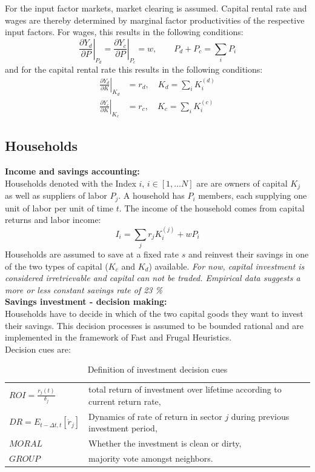 For the input factor markets, market clearing is assumed. Capital rental rate and wages are thereby determined by marginal factor productivities of the respective input factors.
For wages, this results in the following conditions:
\begin{equation}
	\left. \frac{\partial Y_d}{ \partial P} \right|_{P_d} = \left. \frac{\partial Y_c}{\partial P}\right|_{P_c} = w, \qquad P_d + P_c = \sum_i P_i
	\label{eq:wage_rage}
\end{equation}
and for the capital rental rate this results in the following conditions:
\begin{align}
	\left. \frac{\partial Y_d}{\partial K}\right|_{K_d} &= r_d,\quad K_d = \sum_i K^{(d)}_i \nonumber \\
	\left. \frac{\partial Y_c}{\partial K}\right|_{K_c} &= r_c,\quad K_c = \sum_i K^{(c)}_i 
	\label{eq:capital_rental_rate}
\end{align}


\subsection{Households}

\textbf{Income and savings accounting:} \\
Households denoted with the Index $i$, $i \in [1, \dots N]$ are are owners of capital $K_j$ as well as suppliers of labor $P_j$. A household has $P_i$ members, each supplying one unit of labor per unit of time $t$. The income of the household comes from capital returns and labor income:
\begin{equation}
	I_i = \sum_j r_j K^{(j)}_{i} + wP_i 
	\label{eq:household_income}
\end{equation}
Households are assumed to save at a fixed rate $s$ and reinvest their savings in one of the two types of capital ($K_c$ and $K_d$) available.
\textit{ For now, capital investment is considered irretrievable and capital can not be traded. Empirical data suggests a more or less constant savings rate of 23 \%} \\

\textbf{Savings investment - decision making:} \\
Households have to decide in which of the two capital goods they want to invest their savings. This decision processes is assumed to be bounded rational and are implemented in the framework of Fast and Frugal Heuristics.\\
Decision cues are:
\begin{table}[H]
	\centering
	\begin{tabular}{ll}
		$ROI = \frac{r_j(t)}{\delta_j}$ & total return of investment over lifetime according to current return rate,\\
		$DR = E_{t-\Delta t, t}[\dot{r}_j]$ & Dynamics of rate of return in sector $j$ during previous investment period, \\
		$MORAL$ & Whether the investment is clean or dirty, \\
		$GROUP$ & majority vote amongst neighbors. \\
	\end{tabular}
	\caption{Definition of investment decision cues}
	\label{tab:decision_cues}
\end{table}

